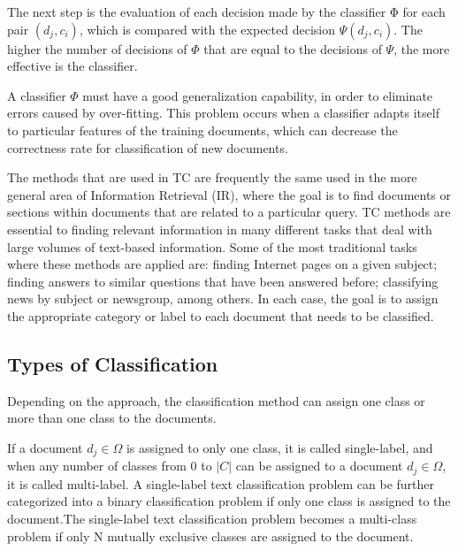The next step is the evaluation of each decision made by the classifier
Φ for each pair $(d_j, c_i)$, which is compared with the expected decision $\Psi(d_j, c_i)$. The higher the number of decisions of $\Phi$ that are equal to the decisions of $\Psi$, the more effective is the classifier.

A classifier $\Phi$ must have a good generalization capability, in order to eliminate errors caused by over-fitting. This problem occurs when a classifier adapts itself to particular features of the training documents, which can decrease the correctness rate for classification of new
documents.

The methods that are used in TC are frequently the same used in the more general area of Information Retrieval (IR), where the goal is to find documents or sections within documents that are related to a particular query. TC methods are essential to finding relevant information in many different tasks that deal with large volumes of text-based information. Some of the most traditional tasks where these methods are applied are: finding Internet pages on a given subject; finding answers to similar questions that have been answered before; classifying news by subject or newsgroup, among others. In each case, the goal is to assign the appropriate category or label to each document that needs to be classified.





\subsection{\hspace*{3pt}Types of Classification}

Depending on the approach, the classification method can assign one class or more than one class to the documents. 

If a document  $ d_j \in \Omega $  is assigned to only one class, it is called single-label, and when any number of classes from 0 to $|C|$ can be assigned to a document $d_j \in \Omega$, it is called multi-label. A single-label text classification problem can be further categorized into a  binary classification problem if only one class is assigned to the document.The single-label text classification problem becomes a multi-class problem if only N mutually exclusive classes are assigned to the document. 

